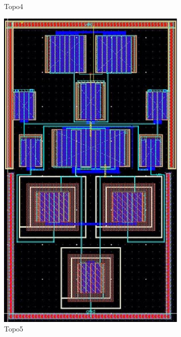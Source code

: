 \begin{figure}[ht]
\begin{subfigure}[t]{0.2\textwidth}
      \caption{Topo4}\label{fig:Topo4}
      \end{subfigure}
      \begin{subfigure}[t]{0.2\textwidth}
      \includegraphics[width=\textwidth]{Fig/MultTopo_Topo5.eps}
      \caption{Topo5}\label{fig:Topo5}
      \end{subfigure}
      \begin{subfigure}[t]{0.2\textwidth}

\end{subfigure}
\end{figure}
